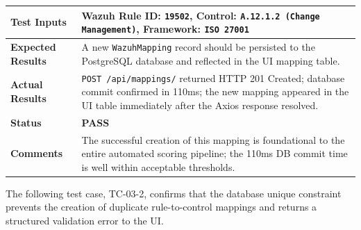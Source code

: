 \begin{table}[H]
{\begin{tabular}{|>{\raggedright\arraybackslash\bfseries}p{4.5cm}|>{\raggedright\arraybackslash}p{11.5cm}|}
        Test Inputs & Wazuh Rule ID: \texttt{19502}, Control: \texttt{A.12.1.2 (Change Management)}, Framework: \texttt{ISO 27001} \\ \hline
        Expected Results & A new \texttt{WazuhMapping} record should be persisted to the PostgreSQL database and reflected in the UI mapping table. \\ \hline
        Actual Results & \texttt{POST /api/mappings/} returned HTTP 201 Created; database commit confirmed in 110ms; the new mapping appeared in the UI table immediately after the Axios response resolved. \\ \hline
        Status & \textcolor{green!60!black}{\textbf{PASS}} \\ \hline
        Comments & The successful creation of this mapping is foundational to the entire automated scoring pipeline; the 110ms DB commit time is well within acceptable thresholds. \\ \hline
    \end{tabular}
    }
\end{table}

The following test case, TC-03-2, confirms that the database unique constraint prevents the creation of duplicate rule-to-control mappings and returns a structured validation error to the UI.

